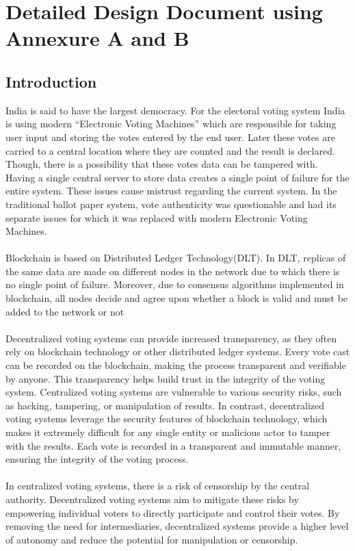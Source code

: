 \documentclass[oneside, 12pt]{book}
\begin{document}
	\section{Detailed Design Document using Annexure A and B}
	\newpage
		\subsection{Introduction}
			India is said to have the largest democracy. For the electoral voting system India is using modern “Electronic Voting Machines” which are responsible for taking user input and storing the votes entered by the end user. Later these votes are carried to a central location where they are counted and the result is declared. Though, there is a possibility that these votes data can be tampered with. Having a single central server to store data creates a single point of failure for the entire system. These issues cause mistrust regarding the current system. In the traditional ballot paper system, vote authenticity was questionable and had its separate issues for which it was replaced with modern Electronic Voting Machines.
			\\\\Blockchain is based on Distributed Ledger Technology(DLT). In DLT, replicas of the same data are made on different nodes in the network due to which there is no single point of failure. Moreover, due to consensus algorithms implemented in blockchain, all nodes decide and agree upon whether a block is valid and must be added to the network or not
			\\\\Decentralized voting systems can provide increased transparency, as they often rely on blockchain technology or other distributed ledger systems. Every vote cast can be recorded on the blockchain, making the process transparent and verifiable by anyone. This transparency helps build trust in the integrity of the voting system.  Centralized voting systems are vulnerable to various security risks, such as hacking, tampering, or manipulation of results. In contrast, decentralized voting systems leverage the security features of blockchain technology, which makes it extremely difficult for any single entity or malicious actor to tamper with the results. Each vote is recorded in a transparent and immutable manner, ensuring the integrity of the voting process.
			\\\\In centralized voting systems, there is a risk of censorship by the central authority. Decentralized voting systems aim to mitigate these risks by empowering individual voters to directly participate and control their votes. By removing the need for intermediaries, decentralized systems provide a higher level of autonomy and reduce the potential for manipulation or censorship.
\end{document}

